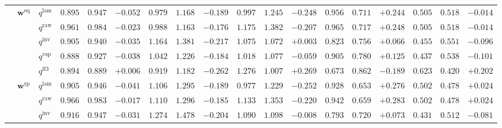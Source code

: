 \documentclass[eng]{kjas3}
\begin{document}
\begin{table}[t]
{\begin{tabular}{lll ccc ccc ccc ccc ccc}
\cmidrule(lr){2-18}
 & $\mathbf{w}^{\mathrm{eq}}$ & $q^{\mathrm{lam}}$ & $0.895$ & $0.947$ & \cellcolor{negred!50}$-0.052$ & $0.979$ & $1.168$ & \cellcolor{negred!50}$-0.189$ & $0.997$ & $1.245$ & \cellcolor{negred!50}$-0.248$ & $0.956$ & $0.711$ & \cellcolor{posgreen!50}$+0.244$ & $0.505$ & $0.518$ & \cellcolor{negred!50}$-0.014$ \\
 &  & $q^{\mathrm{raw}}$ & $0.961$ & $0.984$ & \cellcolor{negred!50}$-0.023$ & $0.988$ & $1.163$ & \cellcolor{negred!50}$-0.176$ & $1.175$ & $1.382$ & \cellcolor{negred!50}$-0.207$ & $0.965$ & $0.717$ & \cellcolor{posgreen!50}$+0.248$ & $0.505$ & $0.518$ & \cellcolor{negred!50}$-0.014$ \\
 &  & $q^{\mathrm{inv}}$ & $0.905$ & $0.940$ & \cellcolor{negred!50}$-0.035$ & $1.164$ & $1.381$ & \cellcolor{negred!50}$-0.217$ & $1.075$ & $1.072$ & \cellcolor{posgreen!50}$+0.003$ & $0.823$ & $0.756$ & \cellcolor{posgreen!50}$+0.066$ & $0.455$ & $0.551$ & \cellcolor{negred!50}$-0.096$ \\
 &  & $q^{\mathrm{vsp}}$ & $0.888$ & $0.927$ & \cellcolor{negred!50}$-0.038$ & $1.042$ & $1.226$ & \cellcolor{negred!50}$-0.184$ & $1.018$ & $1.077$ & \cellcolor{negred!50}$-0.059$ & $0.905$ & $0.780$ & \cellcolor{posgreen!50}$+0.125$ & $0.437$ & $0.538$ & \cellcolor{negred!50}$-0.101$ \\
 &  & $q^{\mathrm{ff3}}$ & $0.894$ & $0.889$ & \cellcolor{posgreen!50}$+0.006$ & $0.919$ & $1.182$ & \cellcolor{negred!50}$-0.262$ & $1.276$ & $1.007$ & \cellcolor{posgreen!50}$+0.269$ & $0.673$ & $0.862$ & \cellcolor{negred!50}$-0.189$ & $0.623$ & $0.420$ & \cellcolor{posgreen!50}$+0.202$ \\
\cmidrule(lr){2-18}
 & $\mathbf{w}^{\mathrm{rp}}$ & $q^{\mathrm{lam}}$ & $0.905$ & $0.946$ & \cellcolor{negred!50}$-0.041$ & $1.106$ & $1.295$ & \cellcolor{negred!50}$-0.189$ & $0.977$ & $1.229$ & \cellcolor{negred!50}$-0.252$ & $0.928$ & $0.653$ & \cellcolor{posgreen!50}$+0.276$ & $0.502$ & $0.478$ & \cellcolor{posgreen!50}$+0.024$ \\
 &  & $q^{\mathrm{raw}}$ & $0.966$ & $0.983$ & \cellcolor{negred!50}$-0.017$ & $1.110$ & $1.296$ & \cellcolor{negred!50}$-0.185$ & $1.133$ & $1.353$ & \cellcolor{negred!50}$-0.220$ & $0.942$ & $0.659$ & \cellcolor{posgreen!50}$+0.283$ & $0.502$ & $0.478$ & \cellcolor{posgreen!50}$+0.024$ \\
 &  & $q^{\mathrm{inv}}$ & $0.916$ & $0.947$ & \cellcolor{negred!50}$-0.031$ & $1.274$ & $1.478$ & \cellcolor{negred!50}$-0.204$ & $1.090$ & $1.098$ & \cellcolor{negred!50}$-0.008$ & $0.793$ & $0.720$ & \cellcolor{posgreen!50}$+0.073$ & $0.431$ & $0.512$ & \cellcolor{negred!50}$-0.081$ \\

\end{tabular}}
\end{table}
\end{document}
